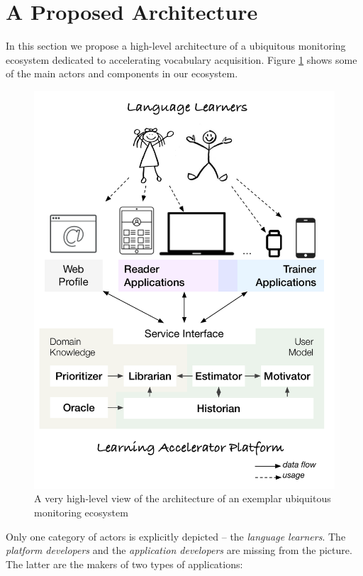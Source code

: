 

\section {A Proposed Architecture}
In this section we propose a high-level architecture of a ubiquitous monitoring ecosystem dedicated to accelerating vocabulary acquisition. 
Figure \ref{fig:architecture} shows some of the main actors and components in our ecosystem.

\begin{figure}[h!]
	\includegraphics[width=0.99\linewidth]{images/zeeguu-architecture.pdf}
	\caption{A very high-level view of the architecture of an exemplar ubiquitous monitoring ecosystem}
	\label{fig:architecture}
\end{figure}

Only one category of actors is explicitly depicted -- the {\em language learners}. The {\em platform developers} and the {\em application developers} are missing from the picture. The latter are the makers of two types of applications: 

